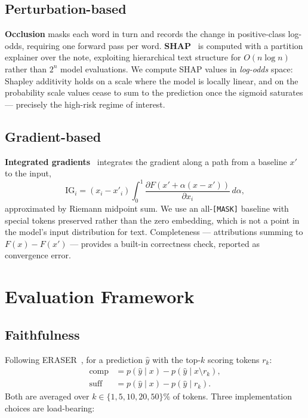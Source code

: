 \documentclass[conference]{IEEEtran}
\begin{document}
\subsection{Perturbation-based}
\textbf{Occlusion} masks each word in turn and records the change in
positive-class log-odds, requiring one forward pass per word.
\textbf{SHAP}~\cite{lundberg2017} is computed with a partition explainer over the
note, exploiting hierarchical text structure for $O(n \log n)$ rather than $2^n$
model evaluations. We compute SHAP values in \emph{log-odds} space: Shapley
additivity holds on a scale where the model is locally linear, and on the
probability scale values cease to sum to the prediction once the sigmoid
saturates --- precisely the high-risk regime of interest.

\subsection{Gradient-based}
\textbf{Integrated gradients}~\cite{sundararajan2017} integrates the gradient
along a path from a baseline $x'$ to the input,
\begin{equation}
\mathrm{IG}_i = (x_i - x'_i)\int_0^1
\frac{\partial F\!\left(x' + \alpha (x - x')\right)}{\partial x_i}\, d\alpha ,
\end{equation}
approximated by Riemann midpoint sum. We use an all-\texttt{[MASK]} baseline with
special tokens preserved rather than the zero embedding, which is not a point in
the model's input distribution for text. Completeness --- attributions summing to
$F(x) - F(x')$ --- provides a built-in correctness check, reported as
convergence error.

\section{Evaluation Framework}\label{sec:framework}

\subsection{Faithfulness}\label{sec:faithfulness}
Following ERASER~\cite{deyoung2020}, for a prediction $\hat{y}$ with the top-$k$
scoring tokens $r_k$:
\begin{align}
\mathrm{comp} &= p(\hat{y}\mid x) - p(\hat{y}\mid x \setminus r_k), \\
\mathrm{suff} &= p(\hat{y}\mid x) - p(\hat{y}\mid r_k).
\end{align}
Both are averaged over $k \in \{1,5,10,20,50\}\%$ of tokens. Three
implementation choices are load-bearing:
\end{document}
